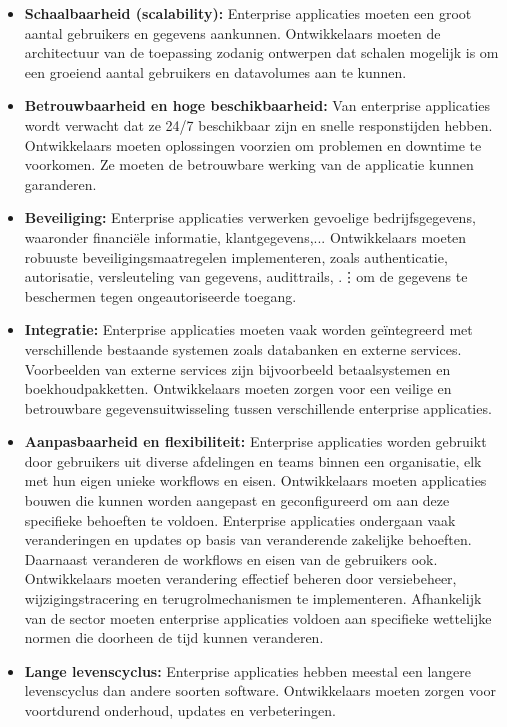 \begin{itemize}
\item{\textbf{Schaalbaarheid (scalability):}} Enterprise applicaties moeten een groot aantal gebruikers en gegevens aankunnen.  Ontwikkelaars moeten de architectuur van de toepassing zodanig ontwerpen dat schalen mogelijk is om een groeiend aantal gebruikers en datavolumes aan te kunnen.

\item{\textbf{Betrouwbaarheid en hoge beschikbaarheid:}} Van enterprise applicaties wordt verwacht dat ze 24/7 beschikbaar zijn en snelle responstijden hebben.  Ontwikkelaars moeten oplossingen voorzien om problemen en downtime te voorkomen.  Ze moeten de betrouwbare werking van de applicatie kunnen garanderen.

\item{\textbf{Beveiliging:}} Enterprise applicaties verwerken gevoelige bedrijfsgegevens, waaronder financiële informatie, klantgegevens,...   Ontwikkelaars moeten robuuste beveiligingsmaatregelen implementeren,  zoals authenticatie,  autorisatie,  versleuteling van gegevens, audittrails, .\vdots om de gegevens te beschermen tegen ongeautoriseerde toegang.

\item{\textbf{Integratie:}} Enterprise applicaties moeten vaak worden geïntegreerd met verschillende bestaande systemen zoals databanken en externe services.  Voorbeelden van externe services zijn bijvoorbeeld betaalsystemen en boekhoudpakketten. Ontwikkelaars moeten zorgen voor een veilige en betrouwbare gegevensuitwisseling tussen verschillende enterprise applicaties. 

\item{\textbf{Aanpasbaarheid en flexibiliteit:}} Enterprise applicaties worden gebruikt door gebruikers uit diverse afdelingen en teams binnen een organisatie, elk met hun eigen unieke workflows en eisen. Ontwikkelaars moeten applicaties bouwen die kunnen worden aangepast en geconfigureerd om aan deze specifieke behoeften te voldoen. 
Enterprise applicaties ondergaan vaak veranderingen en updates op basis van veranderende zakelijke behoeften. Daarnaast veranderen de workflows en eisen van de gebruikers ook. 
Ontwikkelaars moeten verandering effectief beheren door versiebeheer, wijzigingstracering en terugrolmechanismen te implementeren.
Afhankelijk van de sector moeten enterprise applicaties voldoen aan specifieke wettelijke normen die doorheen de tijd kunnen veranderen. 

\item{\textbf{Lange levenscyclus:}} Enterprise applicaties hebben meestal een langere levenscyclus dan andere soorten software.  Ontwikkelaars moeten zorgen voor voortdurend onderhoud,  updates en verbeteringen.


\end{itemize}
